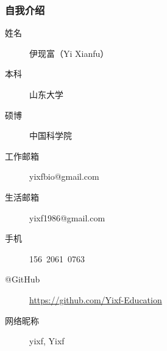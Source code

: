\begin{frame}
  \frametitle{自我介绍}
    \begin{description}
      \item[姓\qquad 名]伊现富（Yi Xianfu）
      \item[本\qquad 科]山东大学
      \item[硕\qquad 博]中国科学院
      \item[工作邮箱]\alert{yixfbio@gmail.com}
      \item[生活邮箱]yixf1986@gmail.com
      \item[手\qquad 机]\alert{156\ 2061\ 0763}
      \item[@GitHub]\alert{\href{https://github.com/Yixf-Education}{https://github.com/Yixf-Education}}
      \item[网络昵称]yixf, Yixf
    \end{description}
\end{frame}



